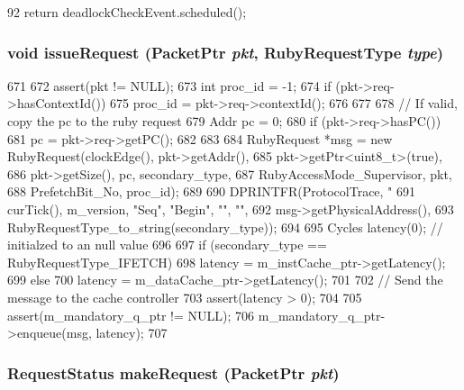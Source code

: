 \begin{DoxyCode}
92     { return deadlockCheckEvent.scheduled(); }
\end{DoxyCode}
\hypertarget{classSequencer_adf180308d81a9eade08f190a0b220c6d}{
\subsubsection[{issueRequest}]{\setlength{\rightskip}{0pt plus 5cm}void issueRequest ({\bf PacketPtr} {\em pkt}, \/  RubyRequestType {\em type})}}
\label{classSequencer_adf180308d81a9eade08f190a0b220c6d}



\begin{DoxyCode}
671 {
672     assert(pkt != NULL);
673     int proc_id = -1;
674     if (pkt->req->hasContextId()) {
675         proc_id = pkt->req->contextId();
676     }
677 
678     // If valid, copy the pc to the ruby request
679     Addr pc = 0;
680     if (pkt->req->hasPC()) {
681         pc = pkt->req->getPC();
682     }
683 
684     RubyRequest *msg = new RubyRequest(clockEdge(), pkt->getAddr(),
685                                        pkt->getPtr<uint8_t>(true),
686                                        pkt->getSize(), pc, secondary_type,
687                                        RubyAccessMode_Supervisor, pkt,
688                                        PrefetchBit_No, proc_id);
689 
690     DPRINTFR(ProtocolTrace, "%
691             curTick(), m_version, "Seq", "Begin", "", "",
692             msg->getPhysicalAddress(),
693             RubyRequestType_to_string(secondary_type));
694 
695     Cycles latency(0);  // initialzed to an null value
696 
697     if (secondary_type == RubyRequestType_IFETCH)
698         latency = m_instCache_ptr->getLatency();
699     else
700         latency = m_dataCache_ptr->getLatency();
701 
702     // Send the message to the cache controller
703     assert(latency > 0);
704 
705     assert(m_mandatory_q_ptr != NULL);
706     m_mandatory_q_ptr->enqueue(msg, latency);
707 }
\end{DoxyCode}
\hypertarget{classSequencer_a23de6e3fbb2362f4410d435e3600d0f7}{
\subsubsection[{makeRequest}]{\setlength{\rightskip}{0pt plus 5cm}RequestStatus makeRequest ({\bf PacketPtr} {\em pkt})}}
\label{classSequencer_a23de6e3fbb2362f4410d435e3600d0f7}



